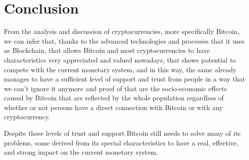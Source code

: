 \documentclass{article}
\newcommand\tab[1][1cm]{\hspace*{#1}}
\begin{document}
\section{Conclusion}

\tab From the analysis and discussion of cryptocurrencies, more specifically Bitcoin, we can infer that, thanks to the advanced technologies and processes that it uses as Blockchain, that allows Bitcoin and most cryptocurrencies to have characteristics very appreciated and valued nowadays, that shows potential to compete with the current monetary system, and in this way, the same already manages to have a sufficient level of support and trust from people in a way that we can’t ignore it anymore and proof of that are the socio-economic effects caused by Bitcoin that are reflected by the whole population regardless of whether or not persons have a direct connection with Bitcoin or with any cryptocurrency.

Despite these levels of trust and support Bitcoin still needs to solve many of its problems, some derived from its special characteristics to have a real, effective, and strong impact on the current monetary system.

\newpage

\nocite{*}
\printbibliography
\end{document}
